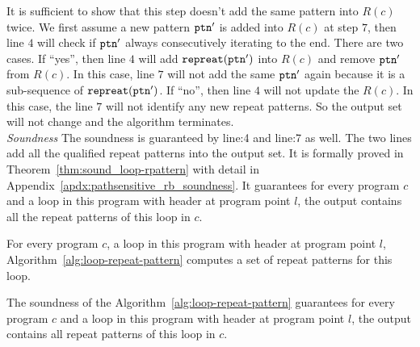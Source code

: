 \begin{enumerate}
It is sufficient to show that this step
doesn't add the same pattern into $R(c)$ twice.
We first assume a new pattern $\mathtt{ptn}'$ is added into $R(c)$ at step $7$, 
%
then line $4$ will check if $\mathtt{ptn}'$ always consecutively iterating to the end.
There are two cases.
If ``yes'', then line $4$ will add $\mathtt{repreat}(\mathtt{ptn}')$ into $R(c)$ and remove $\mathtt{ptn}'$ from $R(c)$.
In this case, line $7$ will not add the same $\mathtt{ptn}'$ again because it is a sub-sequence of $\mathtt{repreat}(\mathtt{ptn}')$.
If ``no'', then line $4$ will not update the $R(c)$. 
In this case, the line $7$ will not identify any new repeat patterns. So the output set will not change and the algorithm terminates.
\\
\emph{Soundness} 
The soundness is guaranteed by line:4 and line:7 as well.
The two lines add all the qualified repeat patterns into the output set.
It is formally proved in Theorem~\ref{thm:sound_loop-rpattern} with detail in Appendix~\ref{apdx:pathsensitive_rb_soundness}.
It guarantees for every program $c$ and a loop in this program with header at program point $l$,
the output contains all the repeat patterns of this loop in $c$.
%
\end{enumerate}
%
%
\begin{thm}
  \label{thm:sound_loop-rpattern}
  For every program $c$, a loop in this program with header at program point $l$,
  Algorithm~\ref{alg:loop-repeat-pattern} computes a set of repeat patterns for this loop.
\end{thm}
The soundness of the Algorithm~\ref{alg:loop-repeat-pattern} guarantees for every program $c$ and a loop in this program with header at program point $l$,
the output contains all repeat patterns of this loop in $c$.
%

